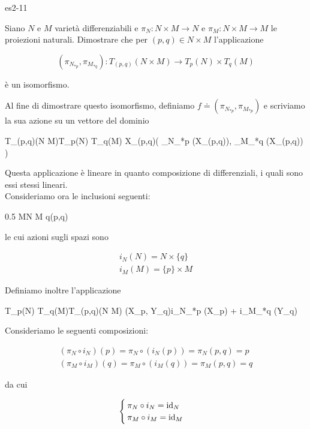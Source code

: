 {es2-11}
{
Siano $ N $ e $ M $ varietà differenziabili e $ \pi_{N} : N \times M \to N $ e $ \pi_{M} : N \times M \to M $ le proiezioni naturali. Dimostrare che per $ (p,q) \in N \times M $ l'applicazione

\begin{equation}
	(\pi_{N_{*p}},\pi_{M_{*q}}) : T_{(p,q)}(N \times M) \to T_{p}(N) \times T_{q}(M)
\end{equation}

è un isomorfismo.
}
{

Al fine di dimostrare questo isomorfismo, definiamo $ f \doteq (\pi_{N_{*p}},\pi_{M_{*p}}) $ e scriviamo la sua azione su un vettore del dominio

	{T_{(p,q)}(N \times M)}{T_{p}(N) \times T_{q}(M)}
	{X_{(p,q)}}{\left( \pi_{N_{*p}} (X_{(p,q)}), \pi_{M_{*q}} (X_{(p,q)}) \right)}

Questa applicazione è lineare in quanto composizione di differenziali, i quali sono essi stessi lineari. \\
Consideriamo ora le inclusioni seguenti:

	{0.5}{%
				{M}{N \times M}
				{q}{(p,q)}
			}

le cui azioni sugli spazi sono

\begin{gather}
	i_{N}(N) = N \times \{q\} \\
	i_{M}(M) = \{p\} \times M
\end{gather}

Definiamo inoltre l'applicazione

	{T_{p}(N) \times T_{q}(M)}{T_{(p,q)}(N \times M)}
	{(X_{p}, Y_{q})}{i_{N_{*p}} (X_{p}) + i_{M_{*q}} (Y_{q})}

Consideriamo le seguenti composizioni:

\begin{gather}
	(\pi_{N} \circ i_{N}) (p) = \pi_{N} \circ (i_{N} (p)) = \pi_{N} (p,q) = p \\
	(\pi_{M} \circ i_{M}) (q) = \pi_{M} \circ (i_{M} (q)) = \pi_{M} (p,q) = q
\end{gather}

da cui

\begin{equation}
	\begin{cases}
		\pi_{N} \circ i_{N} = \operatorname{id}_{N} \\
		\pi_{M} \circ i_{M} = \operatorname{id}_{M}
	\end{cases}
\end{equation}

}
